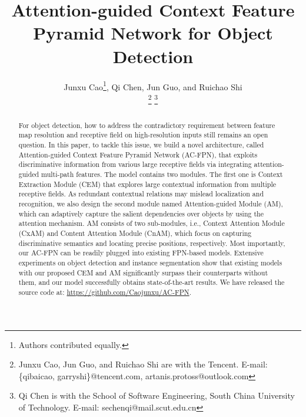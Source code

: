 \documentclass[journal]{IEEEtran}
\begin{document}
	
\title{Attention-guided Context Feature Pyramid Network for Object Detection}




	\author{
		Junxu Cao\thanks{Authors contributed equally.},
		Qi Chen,
		Jun Guo,
		and Ruichao Shi\\
\thanks{Junxu Cao, Jun Guo, and Ruichao Shi are with the Tencent. E-mail: \{qibaicao, garryshi\}@tencent.com, artanis.protoss@outlook.com}
		\thanks{Qi Chen is with the School of Software Engineering, South China University of Technology. E-mail: sechenqi@mail.scut.edu.cn}
	}
	


	
	




	
	
	


	
	


	
	
	
\maketitle
	
	\begin{abstract}
		For object detection, how to address the contradictory requirement between feature map resolution and receptive field on high-resolution inputs still remains an open question. In this paper, to tackle this issue, we build a novel architecture, called Attention-guided Context Feature Pyramid Network (AC-FPN), that exploits discriminative information from various large receptive fields via integrating attention-guided multi-path features. The model contains two modules. The first one is Context Extraction Module (CEM) that explores large contextual information from multiple receptive fields. As redundant contextual relations may mislead localization and recognition, we also design the second module named Attention-guided Module (AM), which can adaptively capture the salient dependencies over objects by using the attention mechanism. AM consists of two sub-modules, i.e., Context Attention Module (CxAM) and Content Attention Module (CnAM), which focus on capturing discriminative semantics and locating precise positions, respectively. Most importantly, our AC-FPN can be readily plugged into existing FPN-based models. Extensive experiments on object detection and instance segmentation show that existing models with our proposed CEM and AM significantly surpass their counterparts without them, and our model successfully obtains state-of-the-art results. We have released the source code at: \href{https://github.com/Caojunxu/AC-FPN}{https://github.com/Caojunxu/AC-FPN}.
	\end{abstract}
	
\end{document}
